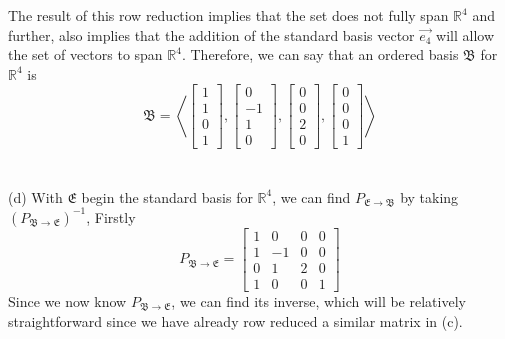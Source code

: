 \documentclass{report}
\begin{document}
The result of this row reduction implies that the set does not fully span $\mathbb{R}^4$ and further, also implies that the addition of the standard basis vector $\vec{e_4}$ will allow the set of vectors to span $\mathbb{R}^4$. Therefore, we can say that an ordered basis $\mathfrak{B}$ for $\mathbb{R}^4$ is
$$
\mathfrak{B} = \left\langle
\begin{bmatrix} 1 \\ 1 \\ 0 \\ 1 \end{bmatrix},
\begin{bmatrix} 0 \\ -1 \\ 1 \\ 0 \end{bmatrix},
\begin{bmatrix} 0 \\ 0 \\ 2 \\ 0 \end{bmatrix},
\begin{bmatrix} 0 \\ 0 \\ 0 \\ 1 \end{bmatrix}
\right\rangle
$$
\\
\\
\noindent(d) With $\mathfrak{E}$ begin the standard basis for $\mathbb{R}^4$, we can find $P_{\mathfrak{E}\rightarrow\mathfrak{B}}$ by taking $(P_{\mathfrak{B}\rightarrow\mathfrak{E}})^{-1}$, Firstly
$$
P_{\mathfrak{B}\rightarrow\mathfrak{E}} =
\begin{bmatrix}
1 & 0 & 0 & 0 \\
1 & -1 & 0 & 0 \\
0 & 1 & 2 & 0 \\
1 & 0 & 0 & 1
\end{bmatrix}
$$
Since we now know $P_{\mathfrak{B}\rightarrow\mathfrak{E}}$, we can find its inverse, which will be relatively straightforward since we have already row reduced a similar matrix in (c).
\end{document}
